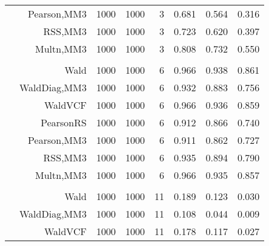 \documentclass[
]{article}
\begin{document}
\begin{table}[H]
{\begin{tabular}[t]{lrrrrrrr}
\hspace{1em} & Pearson,MM3 & 1000 & 1000 & 3 & 0.681 & 0.564 & 0.316\\

\hspace{1em} & RSS,MM3 & 1000 & 1000 & 3 & 0.723 & 0.620 & 0.397\\

\hspace{1em} & Multn,MM3 & 1000 & 1000 & 3 & 0.808 & 0.732 & 0.550\\
\cmidrule{1-8}
\addlinespace[0.3em]
\multicolumn{8}{l}{\textbf{1F 15V}}\\
\hspace{1em} & Wald & 1000 & 1000 & 6 & 0.966 & 0.938 & 0.861\\

\hspace{1em} & WaldDiag,MM3 & 1000 & 1000 & 6 & 0.932 & 0.883 & 0.756\\

\hspace{1em} & WaldVCF & 1000 & 1000 & 6 & 0.966 & 0.936 & 0.859\\

\hspace{1em} & PearsonRS & 1000 & 1000 & 6 & 0.912 & 0.866 & 0.740\\

\hspace{1em} & Pearson,MM3 & 1000 & 1000 & 6 & 0.911 & 0.862 & 0.727\\

\hspace{1em} & RSS,MM3 & 1000 & 1000 & 6 & 0.935 & 0.894 & 0.790\\

\hspace{1em} & Multn,MM3 & 1000 & 1000 & 6 & 0.966 & 0.935 & 0.857\\
\cmidrule{1-8}
\addlinespace[0.3em]
\multicolumn{8}{l}{\textbf{2F 10V}}\\
\hspace{1em} & Wald & 1000 & 1000 & 11 & 0.189 & 0.123 & 0.030\\

\hspace{1em} & WaldDiag,MM3 & 1000 & 1000 & 11 & 0.108 & 0.044 & 0.009\\

\hspace{1em} & WaldVCF & 1000 & 1000 & 11 & 0.178 & 0.117 & 0.027\\


\end{tabular}}
\end{table}
\end{document}
